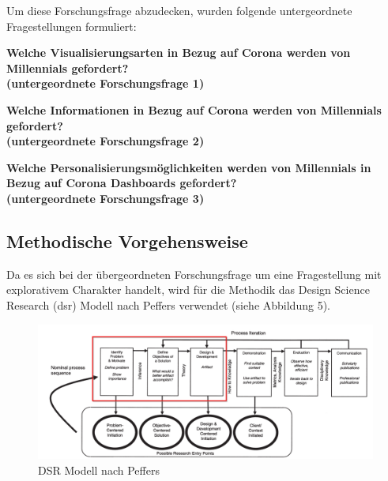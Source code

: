 Um diese Forschungsfrage abzudecken, wurden folgende untergeordnete Fragestellungen formuliert:

\begin{center}
\textbf{Welche Visualisierungsarten in Bezug auf Corona werden von Millennials gefordert?\\
(untergeordnete Forschungsfrage 1)}
\end{center}

\begin{center}
\textbf{Welche Informationen in Bezug auf Corona werden von Millennials gefordert?\\
(untergeordnete Forschungsfrage 2)}
\end{center}

\begin{center}
\textbf{Welche Personalisierungsmöglichkeiten werden von Millennials in Bezug auf Corona Dashboards gefordert?\\
(untergeordnete Forschungsfrage 3)}
\end{center}

\subsection{Methodische Vorgehensweise}
Da es sich bei der übergeordneten Forschungsfrage um eine Fragestellung mit explorativem Charakter handelt, wird für die Methodik das Design Science Research (\Gls{dsr}) Modell nach Peffers verwendet (siehe Abbildung 5).


\begin{figure}[ht]
	\includegraphics[width=12cm]{images/peffers_dsr_model.png}
	\centering
	\caption{DSR Modell nach Peffers ~\citep{peffers}}
\end{figure}

